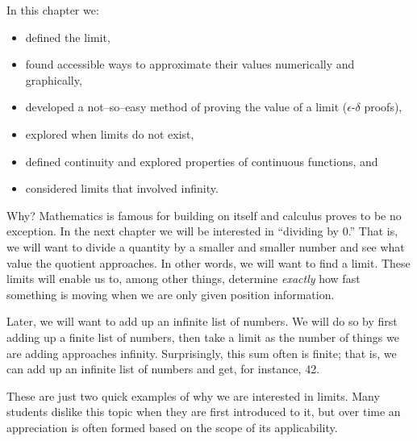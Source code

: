 In this chapter we:
\begin{itemize}
\item defined the limit, 
\item found accessible ways to approximate their values numerically and graphically, 
\item	developed a not--so--easy method of proving the value of a limit ($\epsilon$-$\delta$ proofs),
\item	explored when limits do not exist,
\item	defined continuity and explored properties of continuous functions, and 
\item	considered limits that involved infinity.
\end{itemize}

Why? Mathematics is famous for building on itself and calculus proves to be no exception. In the next chapter we will be interested in ``dividing by 0.'' That is, we will want to divide a quantity by a smaller and smaller number and see what value the quotient approaches. In other words, we will want to find a limit. These limits will enable us to, among other things, determine \textit{exactly} how fast something is moving when we are only given position information.

Later, we will want to add up an infinite list of numbers. We will do so by first adding up a finite list of numbers, then take a limit as the number of things we are adding approaches infinity. Surprisingly, this sum often is finite; that is, we can add up an infinite list of numbers and get, for instance, 42. 

These are just two quick examples of why we are interested in limits. Many students dislike this topic when they are first introduced to it, but over time an appreciation is often formed based on the scope of its applicability.		
